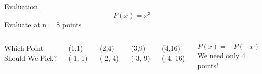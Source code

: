 \documentclass{beamer}
\begin{document}
		\begin{frame}{Evaluation}
                \centering		
                    \begin{equation*}
    			    P(x) = x^3
    			\end{equation*}
                    Evaluate at n = 8 points
                \begin{columns}
                    Which Point Should We Pick?

                    \begin{columns}
                         (1,1)
                         (-1,-1)
                    \end{columns}
                    \begin{columns}
                         (2,4)
                         (-2,-4)
                    \end{columns}
                    \begin{columns}
                         (3,9)
                         (-3,-9)
                    \end{columns}
                    \begin{columns}
                         (4,16)
                         (-4,-16)
                    \end{columns}

                    \begin{equation*}
                        P(x) = -P(-x)
                    \end{equation*}
                    We need only 4 points!
     
        

                \end{columns}
		\end{frame}
	
\end{document}
